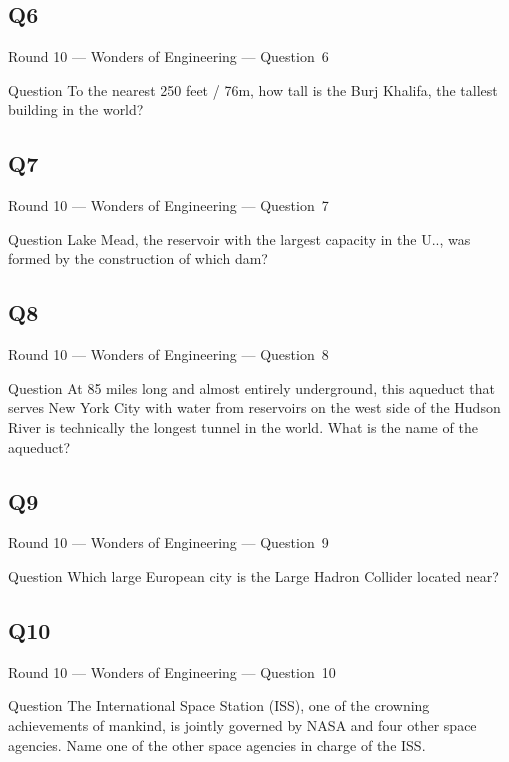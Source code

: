\documentclass[11pt]{beamer}
\begin{document}
\subsection*{Q6}
\begin{frame}[t]{Round 10 --- Wonders of Engineering --- \mbox{Question 6}}
\vspace{-0.5em}
\begin{block}{Question}
To the nearest 250 feet / 76m, how tall is the Burj Khalifa, the tallest building in the world?
\end{block}
\end{frame}
\subsection*{Q7}
\begin{frame}[t]{Round 10 --- Wonders of Engineering --- \mbox{Question 7}}
\vspace{-0.5em}
\begin{block}{Question}
Lake Mead, the reservoir with the largest capacity in the U.\@S.\@, was formed by the construction of which dam?
\end{block}
\end{frame}
\subsection*{Q8}
\begin{frame}[t]{Round 10 --- Wonders of Engineering --- \mbox{Question 8}}
\vspace{-0.5em}
\begin{block}{Question}
At 85 miles long and almost entirely underground, this aqueduct that serves New York City with water from reservoirs on the west side of the Hudson River is technically the longest tunnel in the world. What is the name of the aqueduct?
\end{block}
\end{frame}
\subsection*{Q9}
\begin{frame}[t]{Round 10 --- Wonders of Engineering --- \mbox{Question 9}}
\vspace{-0.5em}
\begin{block}{Question}
Which large European city is the Large Hadron Collider located near?
\end{block}
\end{frame}
\subsection*{Q10}
\begin{frame}[t]{Round 10 --- Wonders of Engineering --- \mbox{Question 10}}
\vspace{-0.5em}
\begin{block}{Question}
The International Space Station (ISS), one of the crowning achievements of mankind, is jointly governed by NASA and four other space agencies. Name one of the other space agencies in charge of the ISS.\@
\end{block}
\end{frame}
\end{document}
